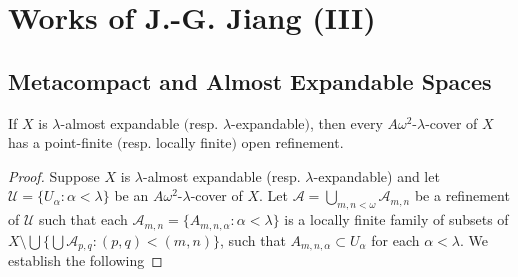 \documentclass[main.tex]{subfiles}
\begin{document}
	
\chapter{Works of J.-G. Jiang (III)} 
	\label{ch7}

\section{Metacompact and Almost Expandable Spaces} \label{sec:7.1}

{\lemma{} \label{lem:7.1.1}
If $X$ is $\lambda$-almost expandable $($resp. $\lambda$-expandable$)$, then 
every $A\omega^2$-$\lambda$-cover of $X$ has a point-finite $($resp. locally finite$)$
open refinement.
}

\begin{proof} 
Suppose $X$ is $\lambda$-almost expandable (resp. $\lambda$-expandable) and 
let $\mathscr{U} = \{U_\alpha: \alpha < \lambda\}$ be an 
$A\omega^2$-$\lambda$-cover of $X$. 
Let $\mathscr{A} = \bigcup_{m, n < \omega}\mathscr{A}_{m,n}$ be a refinement 
of  $\mathscr{U}$ such that each $\mathscr{A}_{m,n} = \{A_{m,n,\alpha}: \alpha < \lambda\}$ 
is a locally finite family of subsets of 
$X\setminus \bigcup\{\bigcup\mathscr{A}_{p,q}: (p,q) < (m,n)\}$, 
such that  $A_{m,n,\alpha} \subset U_\alpha$ for each $\alpha < \lambda$. 
We establish the following


\end{proof}
\end{document}
